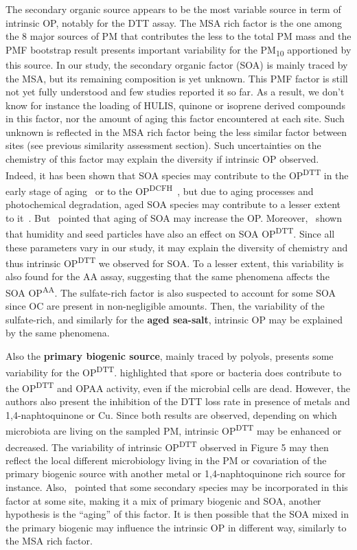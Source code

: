 \documentclass[acp]{copernicus}
\begin{document}
The secondary organic source appears to be the most variable source in
term of intrinsic OP, notably for the DTT assay. The MSA rich factor is
the one among the 8 major sources of PM that contributes the less to the
total PM mass and the PMF bootstrap result presents important
variability for the PM\textsubscript{10} apportioned by this source. In
our study, the secondary organic factor (SOA) is mainly traced by the
MSA, but its remaining composition is yet unknown. This PMF factor is
still not yet fully understood and few studies reported it so far. As a
result, we don't know for instance the loading of HULIS, quinone or
isoprene derived compounds in this factor, nor the amount of aging this
factor encountered at each site. Such unknown is reflected in the MSA
rich factor being the less similar factor between sites (see previous
similarity assessment section). Such uncertainties on the chemistry of
this factor may explain the diversity if intrinsic OP observed. Indeed,
it has been shown that SOA species may contribute to the
OP\textsuperscript{DTT} in the early stage of aging~\citep{mcwhinneyNaphthalene2013}
or to the OP\textsuperscript{DCFH}~\citep{zhouParticlebound2018}, but due to
aging processes and photochemical degradation, aged SOA species may
contribute to a lesser extent to it~\citep{jiangDynamic2018,wangRelationship2017}.
But~\citet{vermaRedox2009,vermaFractionating2015} pointed that aging of SOA may
increase the OP. Moreover,~\citet{tuetChemical2019} shown that humidity and
seed particles have also an effect on SOA OP\textsuperscript{DTT}. Since
all these parameters vary in our study, it may explain the diversity of
chemistry and thus intrinsic OP\textsuperscript{DTT} we observed for
SOA. To a lesser extent, this variability is also found for the AA
assay, suggesting that the same phenomena affects the SOA
OP\textsuperscript{AA}. The sulfate-rich factor is also suspected to
account for some SOA since OC are present in non-negligible amounts.
Then, the variability of the sulfate-rich, and similarly for the
\textbf{aged sea-salt}, intrinsic OP may be explained by the same
phenomena.

Also the \textbf{primary biogenic source}, mainly traced by polyols,
presents some variability for the OP\textsuperscript{DTT}. \citet{samakeUnexpected2017}
highlighted that spore or bacteria does contribute to the
OP\textsuperscript{DTT} and OPAA activity, even if the microbial cells
are dead. However, the authors also present the inhibition of the DTT
loss rate in presence of metals and 1,4-naphtoquinone or Cu. Since both
results are observed, depending on which microbiota are living on the
sampled PM, intrinsic OP\textsuperscript{DTT} may be enhanced or
decreased. The variability of intrinsic OP\textsuperscript{DTT} observed
in Figure 5 may then reflect the local different microbiology living in
the PM or covariation of the primary biogenic source with another metal
or 1,4-naphtoquinone rich source for instance. Also,~\citet{samakePolyols2019}
pointed that some secondary species may be incorporated in this
factor at some site, making it a mix of primary biogenic and SOA,
another hypothesis is the ``aging'' of this factor. It is then possible
that the SOA mixed in the primary biogenic may influence the intrinsic
OP in different way, similarly to the MSA rich factor.
\end{document}
